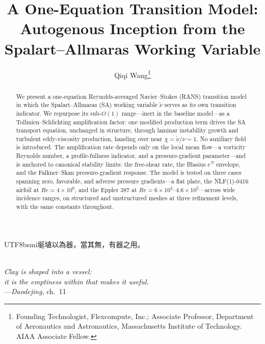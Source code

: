 \documentclass[journal]{new-aiaa}
\title{A One-Equation Transition Model: Autogenous Inception from the
Spalart--Allmaras Working Variable}
\author[1,2]{Qiqi Wang\footnote{Founding Technologist, Flexcompute, Inc.;
Associate Professor, Department of Aeronautics and Astronautics, Massachusetts
Institute of Technology. AIAA Associate Fellow.}}
\affil[1]{Flexcompute, Inc.}
\affil[2]{Department of Aeronautics and Astronautics, Massachusetts Institute of Technology}
\begin{document}
\maketitle

\begin{abstract}
We present a one-equation Reynolds-averaged Navier--Stokes (RANS) transition
model in which the Spalart--Allmaras (SA) working variable $\tilde\nu$ serves as
its own transition indicator. We repurpose its sub-$O(1)$ range---inert in the
baseline model---as a Tollmien--Schlichting amplification factor: one modified
production term drives the SA transport equation, unchanged in structure,
through laminar instability growth and turbulent eddy-viscosity production,
handing over near $\chi\!=\!\tilde\nu/\nu\!\sim\!1$. No auxiliary field is
introduced. The amplification rate depends only on the local mean
flow---a vorticity Reynolds number, a profile-fullness indicator, and a
pressure-gradient parameter---and
is anchored to canonical stability limits: the free-shear rate, the
Blasius $e^N$ envelope, and the Falkner--Skan pressure-gradient response. The
model is tested on three cases spanning zero, favorable, and adverse
pressure gradients---a flat plate, the NLF(1)-0416 airfoil at
$Re\!=\!4\!\times\!10^6$, and the Eppler 387 at
$Re\!=\!6\!\times\!10^4$--$4.6\!\times\!10^5$---across wide incidence ranges,
on structured and unstructured meshes at three refinement levels, with
the same constants throughout.
\end{abstract}

\begin{center}
  \begin{minipage}{0.6\textwidth}\centering
  \begin{CJK}{UTF8}{bsmi}埏埴以為器，當其無，有器之用。\end{CJK}\\[3pt]
  \emph{Clay is shaped into a vessel:\\
  it is the emptiness within that makes it useful.}\\[3pt]
  ---\emph{Daodejing}, ch.~11
  \end{minipage}
\end{center}
\end{document}

